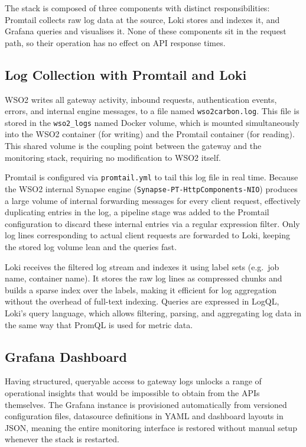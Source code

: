\documentclass[12pt, a4paper]{report}
\begin{document}
The stack is composed of three components with distinct responsibilities: Promtail
collects raw log data at the source, Loki stores and indexes it, and Grafana queries
and visualises it. None of these components sit in the request path, so their operation
has no effect on API response times.

\subsection{Log Collection with Promtail and Loki}
WSO2 writes all gateway activity, inbound requests, authentication events, errors,
and internal engine messages, to a file named \texttt{wso2carbon.log}. This file is
stored in the \texttt{wso2\_logs} named Docker volume, which is mounted simultaneously
into the WSO2 container (for writing) and the Promtail container (for reading). This
shared volume is the coupling point between the gateway and the monitoring stack,
requiring no modification to WSO2 itself.

Promtail is configured via \texttt{promtail.yml} to tail this log file in real time.
Because the WSO2 internal Synapse engine (\texttt{Synapse-PT-HttpComponents-NIO})
produces a large volume of internal forwarding messages for every client request,
effectively duplicating entries in the log, a pipeline stage was added to the
Promtail configuration to discard these internal entries via a regular expression filter.
Only log lines corresponding to actual client requests are forwarded to Loki, keeping
the stored log volume lean and the queries fast.

Loki receives the filtered log stream and indexes it using label sets (e.g.\ job name,
container name). It stores the raw log lines as compressed chunks and builds a sparse
index over the labels, making it efficient for log aggregation without the overhead of
full-text indexing. Queries are expressed in LogQL, Loki's query language, which allows
filtering, parsing, and aggregating log data in the same way that PromQL is used for
metric data.

\subsection{Grafana Dashboard}
Having structured, queryable access to gateway logs unlocks a range of operational
insights that would be impossible to obtain from the APIs themselves. The Grafana
instance is provisioned automatically from versioned configuration files, datasource
definitions in YAML and dashboard layouts in JSON, meaning the entire monitoring
interface is restored without manual setup whenever the stack is restarted.
\end{document}
